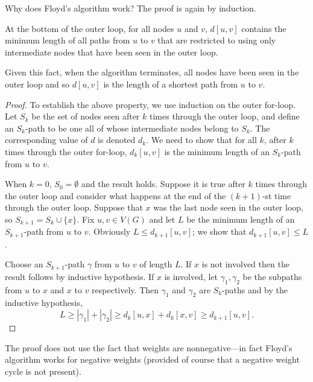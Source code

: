 Why does Floyd's algorithm work? The proof is again by induction.

\begin{Theorem}
\label{thm:floyd}
At the bottom of the outer  loop, for all nodes $u$ and $v$,
$d[u,v]$ contains the minimum length of all paths from $u$ to $v$ that
are restricted to using only intermediate nodes that have been seen in
the outer  loop. 
\end{Theorem}

\begin{note}
Given this fact, when the algorithm terminates, all nodes have been seen
in the outer  loop and so $d[u,v]$ is the length of a
shortest path from $u$ to $v$.
\end{note}

\begin{proof}
To establish the above property, we use induction on the outer for-loop.
Let $S_k$ be the set of nodes seen after $k$ times through the
outer loop, and define an $S_k$-path  to be one all of whose
intermediate nodes belong to $S_k$. The corresponding value of $d$ is 
denoted $d_k$. We need to show that for all $k$, after $k$ times through 
the outer for-loop, $d_k[u,v]$ is the minimum length of an $S_k$-path 
from $u$ to $v$. 

When $k=0$, $S_0 = \emptyset$ and the result holds. Suppose
it is true after $k$ times through the outer loop and consider what
happens at the end of the $(k+1)$-st time through the outer loop.
Suppose that $x$ was the last node seen in the outer loop, so $S_{k+1}=
S_k \cup \{x\}$. Fix $u, v\in V(G)$ and let $L$ be the minimum length of
an $S_{k+1}$-path from $u$ to $v$. Obviously $L \leq d_{k+1}[u,v]$; we
show that $d_{k+1}[u,v] \leq L$. 

Choose an $S_{k+1}$-path $\gamma$ from $u$ to $v$ of length $L$. If $x$
is not involved then the result follows by inductive hypothesis. If $x$
is involved, let $\gamma_1, \gamma_2$ be the subpaths from $u$ to $x$
and $x$ to $v$ respectively. Then $\gamma_1$ and $\gamma_2$ are
$S_k$-paths and by the inductive hypothesis, $$L \geq |\gamma_1| +
|\gamma_2| \geq d_k[u,x] + d_k[x,v] \geq d_{k+1}[u,v].$$
\end{proof}

The proof does not use the fact that weights are nonnegative---in
fact Floyd's algorithm works for negative weights (provided of course
that a negative weight cycle is not present).

